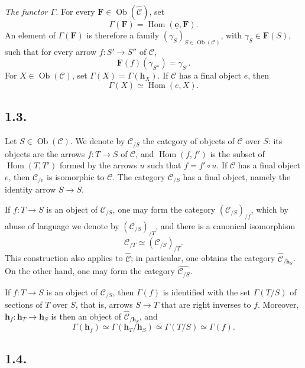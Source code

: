 \medskip
\noindent\textit{The functor \(\Gamma\).}
For every \(\mathbf F\in\operatorname{Ob}(\widehat{\mathscr C})\), set
\[
  \Gamma(\mathbf F)=\operatorname{Hom}
    (\underline{\mathbf e},\mathbf F).
\]
An element of \(\Gamma(\mathbf F)\) is therefore a family
\((\gamma_S)_{S\in\operatorname{Ob}(\mathscr C)}\), with
\(\gamma_S\in\mathbf F(S)\), such that for every arrow
\(f:S'\to S''\) of \(\mathscr C\),
\[
  \mathbf F(f)(\gamma_{S''})=\gamma_{S'}.
\]
For \(X\in\operatorname{Ob}(\mathscr C)\), set
\(\Gamma(X)=\Gamma(\mathbf h_X)\). If \(\mathscr C\) has a final object
\(e\), then
\[
  \Gamma(X)\simeq\operatorname{Hom}(e,X).
\]

\subsection*{1.3.}

Let \(S\in\operatorname{Ob}(\mathscr C)\). We denote by
\(\mathscr C_{/S}\) the category of objects of \(\mathscr C\) over \(S\):
its objects are the arrows \(f:T\to S\) of \(\mathscr C\), and
\(\operatorname{Hom}(f,f')\) is the subset of
\(\operatorname{Hom}(T,T')\) formed by the arrows \(u\) such that
\(f=f'\circ u\). If \(\mathscr C\) has a final object \(e\), then
\(\mathscr C_{/e}\) is isomorphic to \(\mathscr C\). The category
\(\mathscr C_{/S}\) has a final object, namely the identity arrow
\(S\to S\).

If \(f:T\to S\) is an object of \(\mathscr C_{/S}\), one may form the
category \((\mathscr C_{/S})_{/f}\), which by abuse of language we denote by
\((\mathscr C_{/S})_{/T}\), and there is a canonical isomorphism
\[
  \mathscr C_{/T}\simeq(\mathscr C_{/S})_{/T}.
\]
This construction also applies to \(\widehat{\mathscr C}\); in particular,
one obtains the category \(\widehat{\mathscr C}_{/\mathbf h_S}\). On the
other hand, one may form the category \(\widehat{\mathscr C_{/S}}\).

If \(f:T\to S\) is an object of \(\mathscr C_{/S}\), then \(\Gamma(f)\)
is identified with the set \(\Gamma(T/S)\) of sections of \(T\) over \(S\),
that is, arrows \(S\to T\) that are right inverses to \(f\). Moreover,
\(\mathbf h_f:\mathbf h_T\to\mathbf h_S\) is then an object of
\(\widehat{\mathscr C}_{/\mathbf h_S}\), and
\[
  \Gamma(\mathbf h_f)
    \simeq\Gamma(\mathbf h_T/\mathbf h_S)
    \simeq\Gamma(T/S)
    \simeq\Gamma(f).
\]

\subsection*{1.4.}

